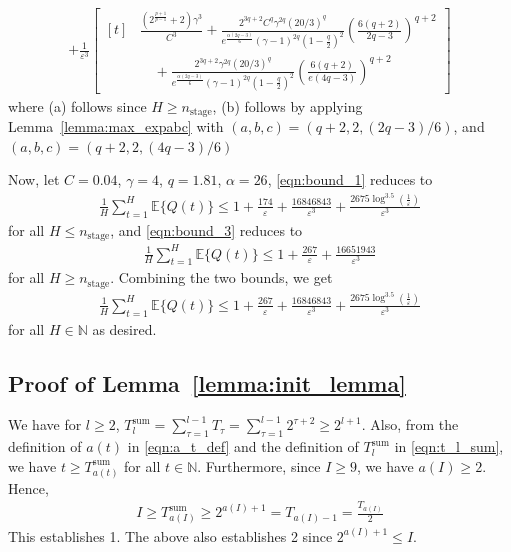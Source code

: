 \documentclass[12pt,draftcls, onecolumn]{IEEEtran}
\begin{document}
{\begin{align}
  + \frac{1}{\varepsilon^3}\left[
    \begin{aligned}[t]
      &\frac{\left(2^{\frac{p+1}{p-1}}+2\right)\gamma^{3}}{C^{3}}
      + \frac{2^{3q+2}C^q\gamma^{2q}(20/3)^q}{e^{\frac{\alpha(2q-3)}{6}}(\gamma-1)^{2q}\!\left(1-\frac{q}{2}\right)^{\!2}}
        \left(\frac{6(q+2)}{2q-3}\right)^{\!q+2}\\
      &\quad
      + \frac{2^{3q+2}\gamma^{2q}(20/3)^q}{e^{\frac{\alpha(2q-3)}{6}}(\gamma-1)^{2q}\!\left(1-\frac{q}{2}\right)^{\!2}}
        \left(\frac{6(q+2)}{e(4q-3)}\right)^{\!q+2}
    \end{aligned}
  \right]
\end{align}
where (a) follows since $H \geq n_{\text{stage}}$, (b) follows by applying Lemma~\ref{lemma:max_expabc} with $(a,b,c)= (q+2,2,(2q-3)/6)$, and $(a,b,c)= (q+2,2,(4q-3)/6)$

Now, let $C = 0.04$, $\gamma = 4$, $q = 1.81$, $\alpha = 26$,  \eqref{eqn:bound_1} reduces to
\begin{align}
    \frac{1}{H}\sum_{t = 1}^H \mathbb{E}\{Q(t)\} \leq 1 + \frac{174}{\varepsilon} + \frac{16846843}{\varepsilon^3} + \frac{2675\log^{3.5}\left(\frac{1}{\varepsilon}\right)}{\varepsilon^3}
\end{align}
for all $H \leq n_{\text{stage}}$, and \eqref{eqn:bound_3} reduces to
\begin{align}
    \frac{1}{H}\sum_{t = 1}^H \mathbb{E}\{Q(t)\} \leq 1 + \frac{267}{\varepsilon} + \frac{16651943}{\varepsilon^3} 
\end{align}
for all $H\geq n_{\text{stage}}$. Combining the two bounds, we get
\begin{align}
    \frac{1}{H}\sum_{t = 1}^H \mathbb{E}\{Q(t)\} \leq 1 + \frac{267}{\varepsilon} +\frac{16846843}{\varepsilon^3} + \frac{2675\log^{3.5}\left(\frac{1}{\varepsilon}\right)}{\varepsilon^3}
\end{align}
for all $H \in \mathbb{N}$ as desired.



\subsection{Proof of Lemma~\ref{lemma:init_lemma}}\label{app:init_lemma}
 
We have for $l \geq 2$, $T^{\text{sum}}_{l} = \sum_{\tau = 1}^{l-1}T_{\tau} = \sum_{\tau = 1}^{l-1}2^{\tau+2} \geq 2^{l+1}$. Also, from the definition of $a(t)$ in \eqref{eqn:a_t_def} and the definition of $T^{\text{sum}}_l$ in \eqref{eqn:t_l_sum}, we have $t \geq T^{\text{sum}}_{a(t)}$ for all $t \in \mathbb{N}$. Furthermore, since $I \geq 9$, we have $a(I) \geq 2$. Hence,
\begin{align}
    I \geq T^{\text{sum}}_{a(I)} \geq 2^{a(I)+1} = T_{a(I)-1}  = \frac{T_{a(I)}}{2} \nonumber
\end{align}
This establishes 1. The above also establishes 2 since $2^{a(I)+1} \leq I$. 

}
\end{document}
